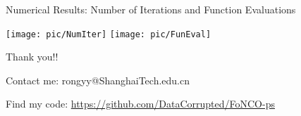 \documentclass[8pt]{beamer}
\begin{document}
 


\begin{frame}[c]{Numerical Results:  Number of Iterations and Function Evaluations}

 \texttt{[image: pic/NumIter]}
  \texttt{[image: pic/FunEval]}
 
\end{frame}

 



\begin{frame}[c]{ }

\centerline{\red \huge Thank you!!}

\vspace{3em}

\centerline{\red \huge  Contact me: rongyy@ShanghaiTech.edu.cn}

\vspace{3em}





\centerline{\red Find my code: \underline  {  https://github.com/DataCorrupted/FoNCO-ps}}



\end{frame}

 
\end{document}
